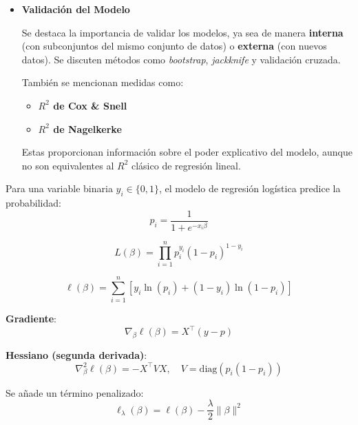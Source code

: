 \documentclass[12pt]{article}
\begin{document}
\begin{itemize}
\item \textbf{Validaci\'on del Modelo}

Se destaca la importancia de validar los modelos, ya sea de manera \textbf{interna} (con subconjuntos del mismo conjunto de datos) o \textbf{externa} (con nuevos datos). Se discuten m\'etodos como \textit{bootstrap}, \textit{jackknife} y validaci\'on cruzada.

Tambi\'en se mencionan medidas como:
\begin{itemize}
  \item \textbf{$R^2$ de Cox \& Snell}
  \item \textbf{$R^2$ de Nagelkerke}
\end{itemize}
Estas proporcionan informaci\'on sobre el poder explicativo del modelo, aunque no son equivalentes al $R^2$ cl\'asico de regresi\'on lineal.
\end{itemize}



Para una variable binaria $y_i \in \{0,1\}$, el modelo de regresión logística predice la probabilidad:
\[
p_i = \frac{1}{1 + e^{-x_i \beta}}
\]

\[
L(\beta) = \prod_{i=1}^n p_i^{y_i} (1 - p_i)^{1 - y_i}
\]

\[
\ell(\beta) = \sum_{i=1}^n \left[ y_i \ln(p_i) + (1 - y_i) \ln(1 - p_i) \right]
\]


\textbf{Gradiente}:
\[
\nabla_\beta \ell(\beta) = X^\top (y - p)
\]

\textbf{Hessiano (segunda derivada)}:
\[
\nabla^2_\beta \ell(\beta) = - X^\top V X, \quad V = \text{diag}(p_i (1 - p_i))
\]

Se añade un término penalizado:
\[
\ell_\lambda(\beta) = \ell(\beta) - \frac{\lambda}{2} \|\beta\|^2
\]
\end{document}

